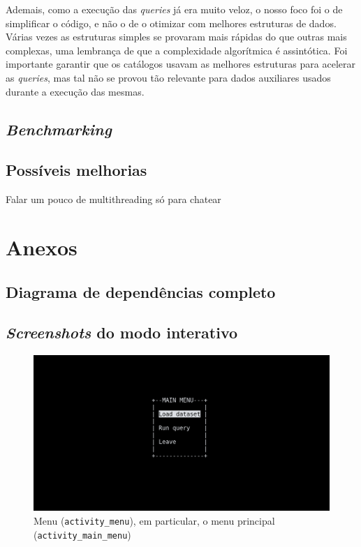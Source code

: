 \documentclass[12pt, a4paper]{article}
\begin{document}
Ademais, como a execução das \emph{queries} já era muito veloz, o nosso foco foi o de simplificar
o código, e não o de o otimizar com melhores estruturas de dados. Várias vezes as estruturas simples
se provaram mais rápidas do que outras mais complexas, uma lembrança de que a complexidade
algorítmica é assintótica. Foi importante garantir que os catálogos usavam as
melhores estruturas para acelerar as \emph{queries}, mas tal não se provou tão relevante para dados
auxiliares usados durante a execução das mesmas.

\subsection{\emph{Benchmarking}}
\label{sec:benchmarking}


\subsection{Possíveis melhorias}
\label{sec:possible-performance-improvements}

{\color{red} Falar um pouco de multithreading só para chatear}

\pagebreak
\section{Anexos}
\label{sec:annexes}

\subsection{Diagrama de dependências completo}
\label{sec:complete-diagram}


\subsection{\emph{Screenshots} do modo interativo}
\label{sec:interactive-screenshots}

\begin{figure}[ht]
    \centering
    \includegraphics[scale=0.25]{res-fase2/interactive_screenshots/main_menu.png}
    \caption{Menu (\texttt{activity\_menu}), em particular, o menu principal
             (\texttt{activity\_main\_menu})}
    \label{fig:main_menu}
\end{figure}
\end{document}
